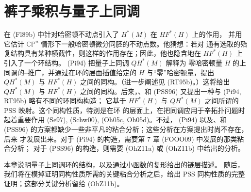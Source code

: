 \chapter{裤子乘积与量子上同调}
\label{ch:pants-product}

\personFloer{}在 (Fl89b) 中针对哈密顿不动点引入了 $H^*(M)$ 在 $HF^*(H)$ 上的作用，
并用它估计 $\mathbb{CP}^n$ 情形下一般哈密顿微分同胚的不动点数。他猜想：若对
通有选取的殆复结构具有某种横截性，则这样的作用存在；因此，他也隐含地在
$HF^*(H)$ 上引入了一个环结构。\personSergeyPiunikhin{} (Pi94) 把量子上同调 $QH^*(M)$ 解释为
零哈密顿量 $H$ 的\personFloer{}上同调的\personBott{}--\personMorse{}推广，并通过在环的层面插值给定的
$H$ 与“零”哈密顿量，提出 $QH^*(M)$ 与 $HF^*(H)$ 之间的同构。（进一步阐述见
(RT95b)。）这将给出 $QH^*(M)$ 与 $HF^*(H)$ 之间的同构。后来，\personPiunikhin{}、\personSalamon{}和\personMatthiasSchwarz{} (PSS96) 又提出一种与 (Pi94, RT95b) 略有不同的环同构构造；
它基于 $HF^*(H)$ 与 $QH^*(M)$ 之间所谓的 PSS 映射。这个同构性质，特别是在环
的层面上，在把\personFloer{}同调应用于辛拓扑问题时起着重要作用 (Se97), (Schw00),
(Oh05c, Oh05d)。不过，\personPiunikhin{} (Pi94) 以及\personPiunikhin{}、\personSalamon{}和\personSchwarz{}
(PSS96) 的方案都缺少一些非平凡的粘合分析；这些分析在方案提出时尚不存在，后来
才发展出来。对于 (Pi94) 的构造，需要第 7 章 (FOOO09) 中发展的那类粘合分析；
对于 (PSS96) 的构造，则需要 (OhZ11a) 或 (OhZ11b) 中给出的分析。

本章说明量子上同调环的结构，以及通过小\personMorse{}函数的\personFloer{}复形给出的链层描述。
随后，我们将在模掉证明同构性质所需的关键粘合分析之后，给出 PSS 同构性质的完整
证明；这部分关键分析留给 (OhZ11b)。





